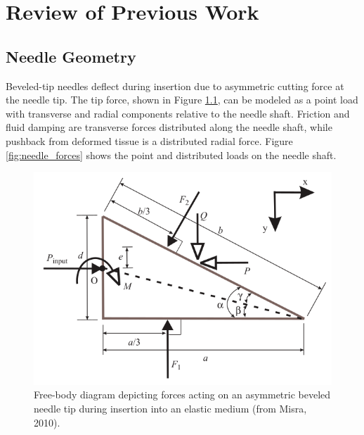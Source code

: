 \chapter{Review of Previous Work}
\label{sec:lit_review} %


\section{Needle Geometry}
Beveled-tip needles deflect during insertion due to asymmetric cutting force at the needle tip. The tip force, shown in Figure \ref{fig:tip_forces}, can be modeled as a point load with transverse  and radial components relative to the needle shaft\cite{misra_mechanics_2010}. Friction and fluid damping are transverse forces distributed along the needle shaft, while pushback from deformed tissue is a distributed radial force. Figure \ref{fig:needle_forces} shows the point and distributed loads on the needle shaft.

\begin{figure}[h]
\includegraphics[width=1.0\textwidth]{Fig/chap2/misra_tip_forces.png}
\caption{Free-body diagram depicting forces acting on an asymmetric beveled needle tip during insertion into an elastic medium (from Misra, 2010).}
\label{fig:tip_forces}
\end{figure}


